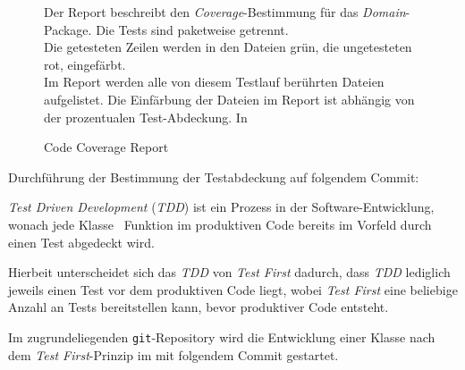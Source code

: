 \begin{figure}[ht!]
\vspace{0.25cm}
\begin{center}
\caption{Code Coverage Report}
\label{fig:Cover}
\end{center}

\vspace{0.25cm}
Der Report beschreibt den \textit{Coverage}-Bestimmung für das \textit{Domain}-Package. Die Tests sind paketweise getrennt.\\
Die getesteten Zeilen werden in den Dateien grün, die ungetesteten rot, eingefärbt.\\
Im Report werden alle von diesem Testlauf berührten Dateien aufgelistet. Die Einfärbung der Dateien im Report ist abhängig von der prozentualen Test-Abdeckung. 
In 
\end{figure}

Durchführung der Bestimmung der Testabdeckung auf folgendem Commit:\\


\textit{Test Driven Development} (\textit{TDD}) ist ein Prozess in der Software-Entwicklung, wonach jede Klasse \bzw\ Funktion im produktiven Code bereits im Vorfeld durch einen Test abgedeckt wird.

Hierbeit unterscheidet sich das \textit{TDD} von \textit{Test First} dadurch, dass \textit{TDD} lediglich jeweils einen Test vor dem produktiven Code liegt, wobei \textit{Test First} eine beliebige Anzahl an Tests bereitstellen kann, bevor produktiver Code entsteht.

Im zugrundeliegenden \texttt{git}-Repository wird die Entwicklung einer Klasse nach dem \textit{Test First}-Prinzip im  mit folgendem Commit gestartet.

